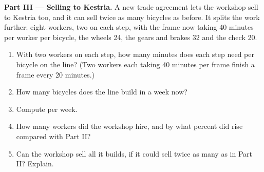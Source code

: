 \begin{problem}
\medskip
\noindent\textbf{Part III --- Selling to Kestria.} A new trade agreement lets the
workshop sell to Kestria too, and it can sell twice as many bicycles as before. It
splits the work further: eight workers, two on each step, with the frame now taking
40 minutes per worker per bicycle, the wheels 24, the gears and brakes 32 and the
check 20.
\begin{enumerate}[resume]
  \item With two workers on each step, how many minutes does each step need per
        bicycle on the line? (Two workers each taking 40 minutes per frame finish a
        frame every 20 minutes.)
  \item How many bicycles does the line build in a week now?
  \item Compute  per week.
  \item How many workers did the workshop hire, and by what percent did  rise compared with Part II?
  \item Can the workshop sell all it builds, if it could sell twice as many as in
        Part II? Explain.
\end{enumerate}
\end{problem}
